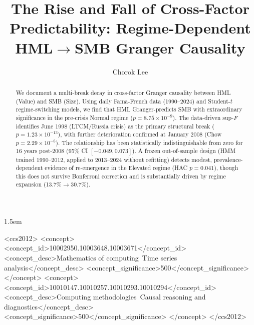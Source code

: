\documentclass[sigconf,anonymous]{acmart}
\begin{document}
\sloppy
\emergencystretch 1.5em

\title{The Rise and Fall of Cross-Factor Predictability: Regime-Dependent HML$\to$SMB Granger Causality}

\author{Chorok Lee}

\begin{abstract}
We document a multi-break decay in cross-factor Granger causality between HML (Value) and SMB (Size).
Using daily Fama-French data (1990--2024) and Student-$t$ regime-switching models, we find that HML Granger-predicts SMB with extraordinary significance in the pre-crisis Normal regime ($p = 8.75 \times 10^{-9}$).
The data-driven sup-$F$ identifies June 1998 (LTCM/Russia crisis) as the primary structural break ($p = 1.23 \times 10^{-13}$), with further deterioration confirmed at January 2008 (Chow $p = 2.29 \times 10^{-6}$).
The relationship has been statistically indistinguishable from zero for 16 years post-2008 (95\% CI $[-0.049, 0.073]$).
A frozen out-of-sample design (HMM trained 1990--2012, applied to 2013--2024 without refitting) detects modest, prevalence-dependent evidence of re-emergence in the Elevated regime (HAC $p = 0.041$), though this does not survive Bonferroni correction and is substantially driven by regime expansion (13.7\%$\to$30.7\%).
\end{abstract}

\begin{CCSXML}
<ccs2012>
   <concept>
       <concept_id>10002950.10003648.10003671</concept_id>
       <concept_desc>Mathematics of computing~Time series analysis</concept_desc>
       <concept_significance>500</concept_significance>
   </concept>
   <concept>
       <concept_id>10010147.10010257.10010293.10010294</concept_id>
       <concept_desc>Computing methodologies~Causal reasoning and diagnostics</concept_desc>
       <concept_significance>500</concept_significance>
   </concept>
</ccs2012>
\end{CCSXML}



\maketitle
\end{document}
